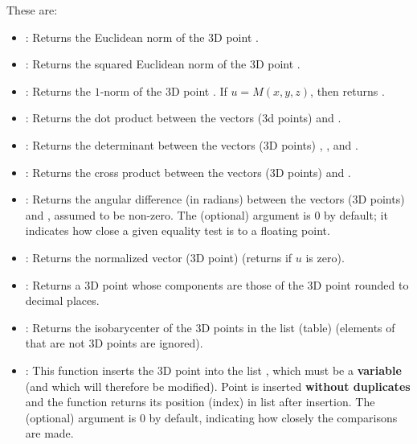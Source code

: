These are:
\begin{itemize}
    \item {}: Returns the Euclidean norm of the 3D point .

    \item {}: Returns the squared Euclidean norm of the 3D point .

    \item {}: Returns the $1$-norm of the 3D point . If $u=M(x,y,z)$, then  returns .

    \item {}: Returns the dot product between the vectors (3d points)  and .

    \item {}: Returns the determinant between the vectors (3D points) , , and .

    \item {}: Returns the cross product between the vectors (3D points)  and .

    \item {}: Returns the angular difference (in radians) between the vectors (3D points)  and , assumed to be non-zero. The (optional) argument  is $0$ by default; it indicates how close a given equality test is to a floating point.

    \item {}: Returns the normalized vector (3D point)  (returns \nil if $u$ is zero).

    \item {}: Returns a 3D point whose components are those of the 3D point  rounded to  decimal places.

    \item {}: Returns the isobarycenter of the 3D points in the list (table)  (elements of  that are not 3D points are ignored).

    \item {}: This function inserts the 3D point  into the list , which must be a \textbf{variable} (and which will therefore be modified). Point  is inserted \textbf{without duplicates} and the function returns its position (index) in list  after insertion. The (optional) argument  is $0$ by default, indicating how closely the comparisons are made.
\end{itemize}



